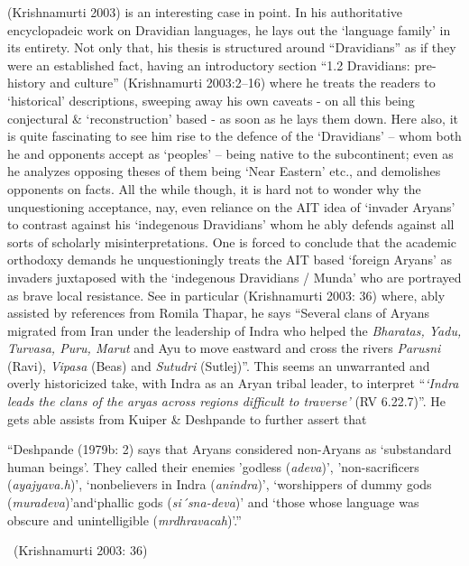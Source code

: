 (Krishnamurti 2003) is an interesting case in point. In his authoritative encyclopadeic work on Dravidian languages, he lays out the ‘language family’ in its entirety. Not only that, his thesis is structured around “Dravidians” as if they were an established fact, having an introductory section “1.2 Dravidians: pre-history and culture” (Krishnamurti 2003:2–16) where he treats the readers to ‘historical’ descriptions, sweeping away his own caveats - on all this being conjectural \& ‘reconstruction’ based - as soon as he lays them down. Here also, it is quite fascinating to see him rise to the defence of the ‘Dravidians’ – whom both he and opponents accept as ‘peoples’ – being native to the subcontinent; even as he analyzes opposing theses of them being ‘Near Eastern’ etc., and demolishes opponents on facts. All the while though, it is hard not to wonder why the unquestioning acceptance, nay, even reliance on the AIT idea of ‘invader Aryans’ to contrast against his ‘indegenous Dravidians’ whom he ably defends against all sorts of scholarly misinterpretations. One is forced to conclude that the academic orthodoxy demands he unquestioningly treats the AIT based ‘foreign Aryans’ as invaders juxtaposed with the ‘indegenous Dravidians / Munda’ who are portrayed as brave local resistance. See in particular (Krishnamurti 2003: 36) where, ably assisted by references from Romila Thapar, he says “Several clans of Aryans migrated from Iran under the leadership of Indra who helped the \textit{Bharatas, Yadu, Turvasa, Puru, Marut} and Ayu to move eastward and cross the rivers \textit{Parusni} (Ravi), \textit{Vipasa} (Beas) and \textit{Sutudri} (Sutlej)”. This seems an unwarranted and overly historicized take, with Indra as an Aryan tribal leader, to interpret “\textit{‘Indra leads the clans of the aryas across regions difficult to traverse’} (RV 6.22.7)”. He gets able assists from Kuiper \& Deshpande to further assert that

\begin{myquote}
“Deshpande (1979b: 2) says that Aryans considered non-Aryans as ‘substandard human beings’. They called their enemies ’godless (\textit{adeva})’, ’non-sacrificers (\textit{ayajyava.h})’, ‘nonbelievers in Indra (\textit{anindra})’, ‘worshippers of dummy gods (\textit{muradeva})’and‘phallic gods (\textit{si´sna-deva})’ and ‘those whose language was obscure and unintelligible (\textit{mrdhravacah})’.” 

~\hfill (Krishnamurti 2003: 36)
\end{myquote}

